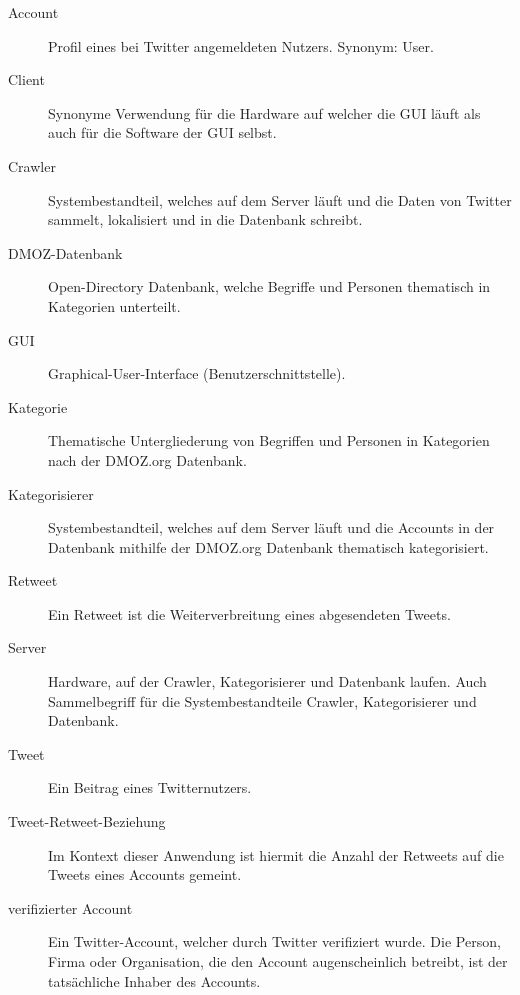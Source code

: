 
\begin{description}
	\item[Account] Profil eines bei Twitter angemeldeten Nutzers. Synonym: User.
	\item[Client] Synonyme Verwendung für die Hardware auf welcher die GUI läuft als auch für die Software der GUI selbst.
	\item[Crawler] Systembestandteil, welches auf dem Server läuft und die Daten von Twitter sammelt, lokalisiert und in die Datenbank schreibt.
	\item [DMOZ-Datenbank] Open-Directory Datenbank, welche Begriffe und Personen thematisch in Kategorien unterteilt.
	\item[GUI] Graphical-User-Interface (Benutzerschnittstelle).
	\item[Kategorie] Thematische Untergliederung von Begriffen und Personen in Kategorien nach der DMOZ.org Datenbank.
	\item[Kategorisierer] Systembestandteil, welches auf dem Server läuft und die Accounts in der Datenbank mithilfe der DMOZ.org Datenbank thematisch kategorisiert.
	\item[Retweet] Ein Retweet ist die Weiterverbreitung eines abgesendeten Tweets.
	\item[Server] Hardware, auf der Crawler, Kategorisierer und  Datenbank laufen. Auch Sammelbegriff für die Systembestandteile Crawler, Kategorisierer und Datenbank.
	\item[Tweet] Ein Beitrag eines Twitternutzers.
	\item[Tweet-Retweet-Beziehung] Im Kontext dieser Anwendung ist hiermit die Anzahl der Retweets auf die Tweets eines Accounts gemeint.
	\item[verifizierter Account] Ein Twitter-Account, welcher durch Twitter verifiziert wurde. Die Person, Firma oder Organisation, die den Account augenscheinlich betreibt, ist der tatsächliche Inhaber des Accounts.
\end{description}

